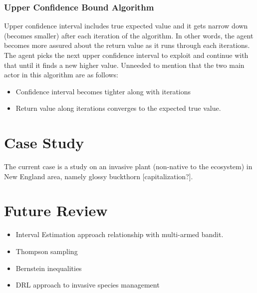 \documentclass[a4paper,12pt]{article}
\begin{document}
\subsubsection{Upper Confidence Bound Algorithm}
Upper confidence interval includes true expected value and it gets narrow down (becomes smaller) after each iteration of the algorithm. In other words, the agent becomes more assured about the return value as it runs through each iterations. The agent picks the next upper confidence interval to exploit and continue with that until it finds a new higher value. Unneeded to mention that the two main actor in this algorithm are as follows:
\begin{itemize}
    \item Confidence interval becomes tighter along with iterations
    \item Return value along iterations converges to the expected true value.
\end{itemize}


\section{Case Study}
The current case is a study on an invasive plant (non-native to the ecosystem) in New England area, namely glossy buckthorn [capitalization?].


\section {Future Review}
\begin{itemize}
    \item Interval Estimation approach relationship with multi-armed bandit.
    \item Thompson sampling
    \item Bernstein inequalities
    \item DRL approach to invasive species management
\end{itemize}








\end{document}
